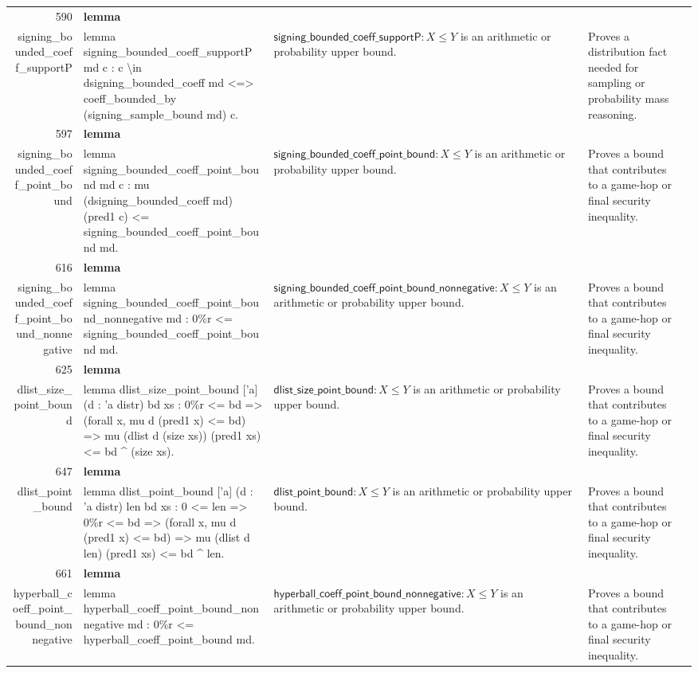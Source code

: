 \documentclass[10pt]{article}
\newcommand{\ec}[1]{\begingroup\ttfamily\scriptsize #1\endgroup}
\begin{document}
\begin{longtable}{r L{0.17\textwidth} L{0.26\textwidth} L{0.27\textwidth} L{0.20\textwidth}}
590 & \textbf{lemma}\\\ec{signing\_bounded\_coeff\_supportP} & \ec{lemma signing\_bounded\_coeff\_supportP md c : c \textbackslash{}in dsigning\_bounded\_coeff md <=> coeff\_bounded\_by (signing\_sample\_bound md) c.} & \(\mathsf{signing\_bounded\_coeff\_supportP} : X \le Y\) is an arithmetic or probability upper bound. & Proves a distribution fact needed for sampling or probability mass reasoning. \\
597 & \textbf{lemma}\\\ec{signing\_bounded\_coeff\_point\_bound} & \ec{lemma signing\_bounded\_coeff\_point\_bound md c : mu (dsigning\_bounded\_coeff md) (pred1 c) <= signing\_bounded\_coeff\_point\_bound md.} & \(\mathsf{signing\_bounded\_coeff\_point\_bound} : X \le Y\) is an arithmetic or probability upper bound. & Proves a bound that contributes to a game-hop or final security inequality. \\
616 & \textbf{lemma}\\\ec{signing\_bounded\_coeff\_point\_bound\_nonnegative} & \ec{lemma signing\_bounded\_coeff\_point\_bound\_nonnegative md : 0\%r <= signing\_bounded\_coeff\_point\_bound md.} & \(\mathsf{signing\_bounded\_coeff\_point\_bound\_nonnegative} : X \le Y\) is an arithmetic or probability upper bound. & Proves a bound that contributes to a game-hop or final security inequality. \\
625 & \textbf{lemma}\\\ec{dlist\_size\_point\_bound} & \ec{lemma dlist\_size\_point\_bound ['a] (d : 'a distr) bd xs : 0\%r <= bd => (forall x, mu d (pred1 x) <= bd) => mu (dlist d (size xs)) (pred1 xs) <= bd \textasciicircum{} (size xs).} & \(\mathsf{dlist\_size\_point\_bound} : X \le Y\) is an arithmetic or probability upper bound. & Proves a bound that contributes to a game-hop or final security inequality. \\
647 & \textbf{lemma}\\\ec{dlist\_point\_bound} & \ec{lemma dlist\_point\_bound ['a] (d : 'a distr) len bd xs : 0 <= len => 0\%r <= bd => (forall x, mu d (pred1 x) <= bd) => mu (dlist d len) (pred1 xs) <= bd \textasciicircum{} len.} & \(\mathsf{dlist\_point\_bound} : X \le Y\) is an arithmetic or probability upper bound. & Proves a bound that contributes to a game-hop or final security inequality. \\
661 & \textbf{lemma}\\\ec{hyperball\_coeff\_point\_bound\_nonnegative} & \ec{lemma hyperball\_coeff\_point\_bound\_nonnegative md : 0\%r <= hyperball\_coeff\_point\_bound md.} & \(\mathsf{hyperball\_coeff\_point\_bound\_nonnegative} : X \le Y\) is an arithmetic or probability upper bound. & Proves a bound that contributes to a game-hop or final security inequality. \\

\end{longtable}
\end{document}
